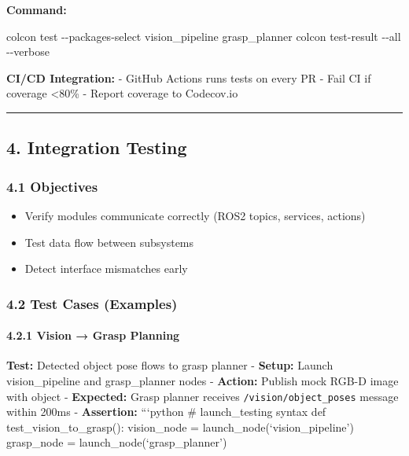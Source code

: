\documentclass[
]{article}
\newenvironment{Shaded}{\begin{snugshade}}{\end{snugshade}}
\newcommand{\AttributeTok}[1]{\textcolor[rgb]{0.13,0.29,0.53}{#1}}
\newcommand{\ExtensionTok}[1]{#1}
\newcommand{\NormalTok}[1]{#1}
\providecommand{\tightlist}{%
  \setlength{\itemsep}{0pt}\setlength{\parskip}{0pt}}
\begin{document}
\textbf{Command:}

\begin{Shaded}
\begin{Highlighting}[]
\ExtensionTok{colcon}\NormalTok{ test }\AttributeTok{{-}{-}packages{-}select}\NormalTok{ vision\_pipeline grasp\_planner}
\ExtensionTok{colcon}\NormalTok{ test{-}result }\AttributeTok{{-}{-}all} \AttributeTok{{-}{-}verbose}
\end{Highlighting}
\end{Shaded}

\textbf{CI/CD Integration:} - GitHub Actions runs tests on every PR -
Fail CI if coverage \textless80\% - Report coverage to Codecov.io

\begin{center}\rule{0.5\linewidth}{0.5pt}\end{center}

\hypertarget{integration-testing}{%
\subsection{4. Integration Testing}\label{integration-testing}}

\hypertarget{objectives-1}{%
\subsubsection{4.1 Objectives}\label{objectives-1}}

\begin{itemize}
\tightlist
\item
  Verify modules communicate correctly (ROS2 topics, services, actions)
\item
  Test data flow between subsystems
\item
  Detect interface mismatches early
\end{itemize}

\hypertarget{test-cases-examples-1}{%
\subsubsection{4.2 Test Cases (Examples)}\label{test-cases-examples-1}}

\hypertarget{vision-grasp-planning}{%
\paragraph{4.2.1 Vision → Grasp Planning}\label{vision-grasp-planning}}

\textbf{Test:} Detected object pose flows to grasp planner -
\textbf{Setup:} Launch vision\_pipeline and grasp\_planner nodes -
\textbf{Action:} Publish mock RGB-D image with object -
\textbf{Expected:} Grasp planner receives \texttt{/vision/object\_poses}
message within 200ms - \textbf{Assertion:} ```python \# launch\_testing
syntax def test\_vision\_to\_grasp(): vision\_node =
launch\_node(`vision\_pipeline') grasp\_node =
launch\_node(`grasp\_planner')
\end{document}
